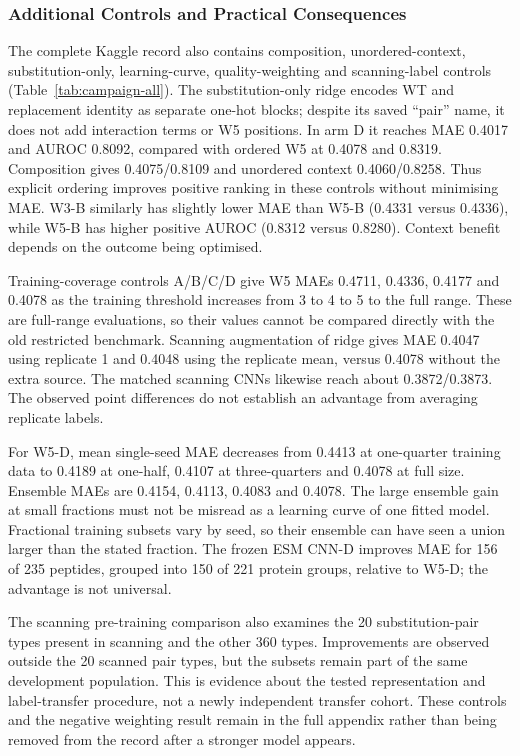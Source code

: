 

\subsubsection{Additional Controls and Practical Consequences}
The complete Kaggle record also contains composition, unordered-context, substitution-only,
learning-curve, quality-weighting and scanning-label controls (Table~\ref{tab:campaign-all}).
The substitution-only ridge encodes WT and replacement identity as separate one-hot blocks;
despite its saved ``pair'' name, it does not add interaction terms or W5 positions. In arm D it
reaches MAE 0.4017 and AUROC 0.8092, compared with ordered W5 at 0.4078 and 0.8319.
Composition gives 0.4075/0.8109 and unordered context 0.4060/0.8258. Thus explicit ordering
improves positive ranking in these controls without minimising MAE. W3-B similarly has slightly
lower MAE than W5-B (0.4331 versus 0.4336), while W5-B has higher positive AUROC
(0.8312 versus 0.8280). Context benefit depends on the outcome being optimised.

Training-coverage controls A/B/C/D give W5 MAEs 0.4711, 0.4336, 0.4177 and 0.4078 as the
training threshold increases from 3 to 4 to 5 to the full range. These are full-range evaluations,
so their values cannot be compared directly with the old restricted benchmark. Scanning augmentation
of ridge gives MAE 0.4047 using replicate 1 and 0.4048 using the replicate mean, versus 0.4078
without the extra source. The matched scanning CNNs likewise reach about 0.3872/0.3873.
The observed point differences do not establish an advantage from averaging replicate labels.

For W5-D, mean single-seed MAE decreases from 0.4413 at one-quarter training data to 0.4189 at
one-half, 0.4107 at three-quarters and 0.4078 at full size. Ensemble MAEs are 0.4154, 0.4113,
0.4083 and 0.4078. The large ensemble gain at small fractions must not be misread as a learning
curve of one fitted model. Fractional training subsets vary by seed, so their ensemble can have
seen a union larger than the stated fraction. The frozen ESM CNN-D improves MAE for 156 of
235 peptides, grouped
into 150 of 221 protein groups, relative to W5-D; the advantage is not universal.

The scanning pre-training comparison also examines the 20 substitution-pair types present
in scanning and the other 360 types. Improvements are observed outside the 20 scanned pair types,
but the subsets remain part of the same development population. This is evidence about the tested
representation and label-transfer procedure, not a newly independent transfer cohort. These controls
and the negative weighting result remain in the full appendix rather than being removed from the
record after a stronger model appears.


